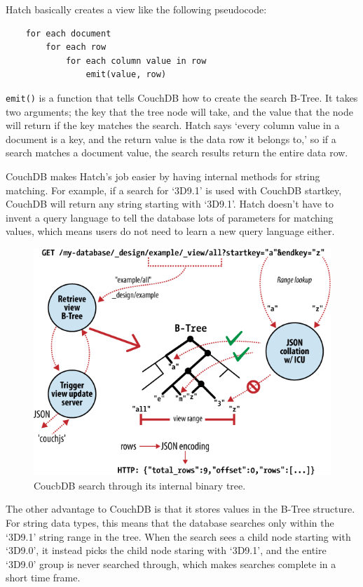 Hatch basically creates a view like the following pseudocode:
\singlespacing
\begin{lstlisting}
	for each document
		for each row
			for each column value in row
				emit(value, row)
\end{lstlisting}
\doublespacing

\texttt{emit()} is a function that tells CouchDB how to create the search B-Tree. It 
takes two arguments; the key that the tree node will take, and the value that the 
node will return if the key matches the search. Hatch says `every column value in a 
document is a key, and the return value is the data row it belongs to,' so if a search
matches a document value, the search results return the entire data row.

CouchDB makes Hatch's job easier by having internal methods for string matching. For
example, if a search for `3D9.1' is used with CouchDB startkey, CouchDB will return
any string starting with `3D9.1'. Hatch doesn't have to invent a query language to 
tell the database lots of parameters for matching values, which means users do not
need to learn a new query language either.

\begin{figure}[h]
	\begin{center}
	\includegraphics[width=120mm]{images/couchdb_b_tree}
	\caption{CoucbDB search through its internal binary tree.} 
	\label{couchdb_b_tree}
	\end{center}
\end{figure}

The other advantage to CouchDB is that it stores values in the B-Tree structure. For
string data types, this means that the database searches only within the `3D9.1' string range
in the tree. When the search sees a child node starting with `3D9.0', it instead picks
the child node staring with `3D9.1', and the entire `3D9.0' group is never searched 
through, which makes searches complete in a short time frame.

